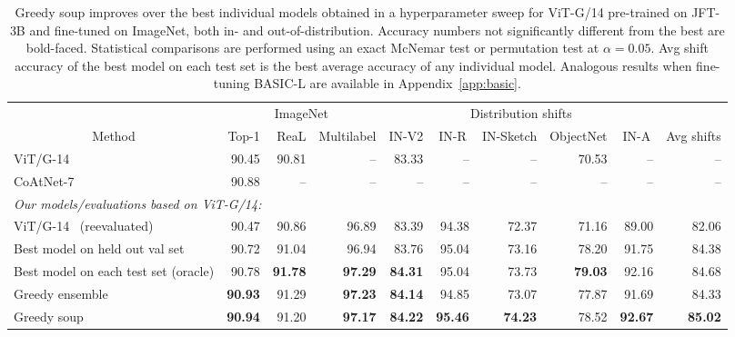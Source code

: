 \documentclass[nohyperref]{article}
\theoremstyle{plain}
\theoremstyle{definition}
\theoremstyle{remark}
\begin{document}
        \begin{table}
            \caption{Greedy soup improves over the best individual models obtained in a hyperparameter sweep for ViT-G/14 pre-trained on JFT-3B and fine-tuned on ImageNet, both in- and out-of-distribution. Accuracy numbers not significantly different from the best are bold-faced. Statistical comparisons are performed using an exact McNemar test or permutation test at $\alpha = 0.05$. Avg shift accuracy of the best model on each test set is the best average accuracy of any individual model.
            Analogous results when fine-tuning BASIC-L are available in Appendix~\ref{app:basic}.}
            \vspace*{-0.3cm}
            \label{tab:vit_g_finetuned_result}
            \centering
            \footnotesize
            \setlength{\tabcolsep}{0.4em}
            \begin{tabular}{ l | r r r | r r r r r | r}
                \toprule
                & \multicolumn{3}{c|}{ImageNet} & \multicolumn{5}{c|}{Distribution shifts} & \\\cmidrule(l{2pt}r{2pt}){2-4}\cmidrule(l{2pt}r{2pt}){5-9}
                \multicolumn{1}{c|}{Method} & Top-1 & ReaL & Multilabel  & \multicolumn{1}{c}{IN-V2} & \multicolumn{1}{c}{IN-R} & \multicolumn{1}{c}{IN-Sketch} & \multicolumn{1}{c}{ObjectNet} & \multicolumn{1}{c|}{IN-A} & \multicolumn{1}{c}{Avg shifts}\\
                \midrule
                ViT/G-14~\cite{zhai2021scaling} & 90.45 & 90.81 & -- & 83.33 & -- & -- & 70.53 & -- & -- \\
                CoAtNet-7~\cite{dai2021coatnet} & 90.88 & -- & -- & -- & -- & -- & -- & -- & -- \\
                \midrule
                \multicolumn{10}{l}{\textit{Our models/evaluations based on ViT-G/14:}}\\
                ViT/G-14~\cite{zhai2021scaling} (reevaluated) & 90.47 & 90.86 & 96.89 & 83.39 & 94.38 & 72.37 & 71.16 & 89.00 & 82.06 \\
               Best model on held out val set & 90.72 & 91.04 & 96.94 & 83.76 & 95.04 & 73.16 & 78.20 & 91.75 & 84.38 \\
               Best model on each test set (oracle) & 90.78 & \textbf{91.78} & \textbf{97.29} & \textbf{84.31} & 95.04 & 73.73 & \textbf{79.03} & 92.16 & 84.68 \\
                Greedy ensemble & \textbf{90.93} & 91.29 & \textbf{97.23} & \textbf{84.14} & 94.85 & 73.07 & 77.87 & 91.69 & 84.33\\
                Greedy soup & \textbf{90.94} & 91.20 & \textbf{97.17} & \textbf{84.22} & \textbf{95.46} & \textbf{74.23} & 78.52 & \textbf{92.67} & \textbf{85.02} \\
                
                \bottomrule
            \end{tabular}
            \end{table}
\end{document}
